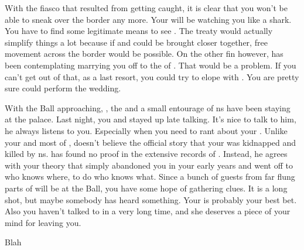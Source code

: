 \documentclass[char]{NeptuneBall}
\begin{document}
With the fiasco that resulted from getting caught, it is clear that you won't be able to sneak over the border any more. Your \cKing{\parent} will be watching you like a shark. You have to find some legitimate means to see \cDiplomat{}. The treaty would actually simplify things a lot because if \pPacifica{} and \pAtlantis{} could be brought closer together, free movement across the border would be possible. On the other fin however, \cKing{\King} \cKing{} has been contemplating marrying you off to the \cPrince{\prince} of \pPacifica{}. That would be a problem.  If you can't get out of that, as a last resort, you could try to elope with \cDiplomat{}. You are pretty sure \cPriest{} could perform the wedding.

With the \cExExKing{} Ball approaching, \cDiplomat{}, the \cPrince{\prince} and a small entourage of \pPacifica{}ns have been staying at the palace. Last night, you and \cDiplomat{} stayed up late talking. It's nice to talk to him, he always listens to you. Especially when you need to rant about your \cQueen{\parent}. Unlike your \cKing{\parent} and most of \pAtlantis{}, \cDiplomat{} doesn't believe the official story that your \cQueen{\parent} was kidnapped and killed by \pPacifica{}ns. \cDiplomat{\They} has found no proof in the extensive records of \pPacifica{}. Instead, he agrees with your theory that \cQueen{\King} \cQueen{} simply abandoned you in your early years and went off to who knows where, to do who knows what.  Since a bunch of guests from far flung parts of \pAtlantis{} will be at the Ball, you have some hope of gathering clues. It is a long shot, but maybe somebody has heard something. Your \cAriel{\sibling} \cAriel{} is probably your best bet. Also you haven't talked to \cAriel{} in a very long time, and she deserves a piece of your mind for leaving you.




\begin{itemz}[Goals]
  \item Blah
\end{itemz}

\begin{contacts}
  \contact{}
\end{contacts}
\end{document}
